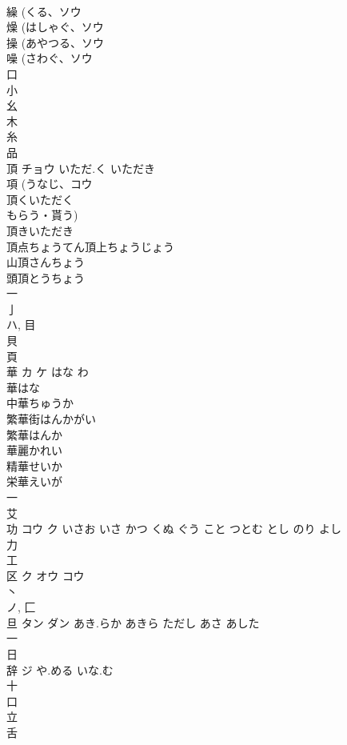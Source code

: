 \documentclass[8pt]{extreport}
\begin{document}
\begin{CJK}{UTF8}{min}
\\	繰 (くる、ソウ 
\\	燥 (はしゃぐ、ソウ 
\\	操 (あやつる、ソウ 
\\	噪 (さわぐ、ソウ 
\\	口 
\\	小 
\\	幺 
\\	木 
\\	糸 
\\	品 
\\	頂	チョウ	いただ.く いただき	
\\	項 (うなじ、コウ 
\\	頂くいただく
\\	もらう・貰う) 
\\	頂きいただき
\\	頂点ちょうてん頂上ちょうじょう
\\	山頂さんちょう
\\	頭頂とうちょう
\\	一 
\\	亅 
\\	ハ, 目 
\\	貝 
\\	頁 
\\	華	カ ケ	はな わ	
\\	華はな 
\\	中華ちゅうか 
\\	繁華街はんかがい 
\\	繁華はんか 
\\	華麗かれい 
\\	精華せいか 
\\	栄華えいが 
\\	一 
\\	艾 
\\	功	コウ ク	いさお いさ かつ くぬ ぐう こと つとむ とし のり よし	
\\	力 
\\	工 
\\	区	ク オウ コウ		
\\	丶 
\\	ノ, 匚 
\\	旦	タン ダン	あき.らか あきら ただし あさ あした	
\\	一 
\\	日 
\\	辞	ジ	や.める いな.む	
\\	十 
\\	口 
\\	立 
\\	舌 

\end{CJK}
\end{document}
